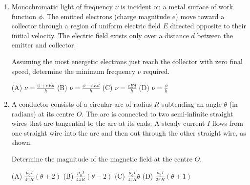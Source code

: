 \documentclass[12pt]{article}
\begin{document}
\begin{enumerate}[label=\arabic*., leftmargin=0pt, itemindent=18pt, itemsep=1em]
Determine the velocity for which the particle passes undeflected.

(A) $\frac{E}{B}$  
(B) $EB$  
(C) $\frac{B}{E}$  
(D) $\frac{E}{B^2}$

\item Monochromatic light of frequency $\nu$ is incident on a metal surface of work function $\phi$. The emitted electrons (charge magnitude $e$) move toward a collector through a region of uniform electric field $E$ directed opposite to their initial velocity. The electric field exists only over a distance $d$ between the emitter and collector.

Assuming the most energetic electrons just reach the collector with zero final speed, determine the minimum frequency $\nu$ required.

(A) $\nu = \frac{\phi + eEd}{h}$  
(B) $\nu = \frac{\phi - eEd}{h}$  
(C) $\nu = \frac{eEd}{h}$  
(D) $\nu = \frac{\phi}{h}$

\item A conductor consists of a circular arc of radius $R$ subtending an angle $\theta$ (in radians) at its centre $O$. The arc is connected to two semi-infinite straight wires that are tangential to the arc at its ends. A steady current $I$ flows from one straight wire into the arc and then out through the other straight wire, as shown.

Determine the magnitude of the magnetic field at the centre $O$.

\begin{center}
\end{center}

(A) $\frac{\mu_0 I}{4\pi R}(\theta + 2)$  
(B) $\frac{\mu_0 I}{4\pi R}(\theta - 2)$  
(C) $\frac{\mu_0 I}{4\pi R}\theta$  
(D) $\frac{\mu_0 I}{2\pi R}(\theta + 1)$


\end{enumerate}
\end{document}
